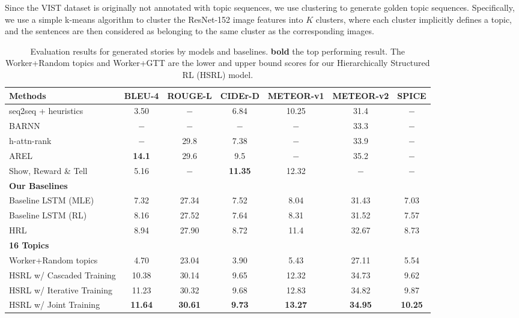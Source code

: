 \documentclass[letterpaper]{article} \usepackage{aaai19}  \usepackage{times}  \usepackage{helvet}  \usepackage{courier}  \usepackage{url}  \usepackage{graphicx}
\begin{document}
Since the VIST dataset \cite{huang2016visual} is originally not annotated with topic sequences, we use clustering to generate golden topic sequences. Specifically, we use a simple k-means algorithm to cluster the ResNet-152 image features into $K$ clusters, where each cluster implicitly defines a topic, and the  sentences are then considered as belonging to the same cluster as the corresponding images. 




{\small
	\begin{table*}[htb]
		\small
		\caption{\small Evaluation results for generated stories by models and baselines. \textbf{bold} the top performing result. The Worker+Random topics and Worker+GTT are the lower and upper bound scores for our Hierarchically Structured RL (HSRL) model. }
\label{table:BLEU}
		\centering
		\begin{tabular}{lcccccc}
			\hline
			Methods       & BLEU-4 & ROUGE-L &   CIDEr-D & METEOR-v1 & METEOR-v2 & SPICE\\
			\hline
seq2seq + heuristics~\cite{huang2016visual} & 3.50 & $-$ & 6.84 & 10.25 & 31.4 & $-$\\
BARNN~\cite{liu2017let} & $-$ & $-$ & $-$ & $-$ & 33.3 & $-$\\
			h-attn-rank~\cite{yu2017hierarchically} & $-$ & 29.8 & 7.38  & $-$ & 33.9 & $-$\\
			AREL~\cite{wang2018no} & \textbf{14.1} & 29.6 & 9.5  & $-$ & 35.2 & $-$\\
			Show, Reward \& Tell~\cite{wang2018show} & 5.16 & $-$ & \textbf{11.35}  & 12.32 & $-$ & $-$\\
			\hline
			\multicolumn{7}{l}{\textbf{Our Baselines}} \\
			\hline
			Baseline LSTM (MLE)  & 7.32 & 27.34 & 7.52 & 8.04 & 31.43 & 7.03\\
			Baseline LSTM (RL)  & 8.16 & 27.52 & 7.64 & 8.31 & 31.52 & 7.57\\
			HRL~\cite{wang2018video} & 8.94 & 27.90 & 8.72 & 11.4 & 32.67 & 8.73 \\
			\hline
			\multicolumn{7}{l}{\textbf{16 Topics}} \\
			\hline
			Worker+Random topics & 4.70 & 23.04 & 3.90 & 5.43 & 27.11 & 5.54\\
			HSRL w/ Cascaded Training & 10.38 & 30.14 & 9.65 & 12.32 & 34.73 & 9.62\\
			HSRL w/ Iterative Training & 11.23 & 30.32 & 9.68 & 12.83 & 34.82 & 9.87 \\
			HSRL w/ Joint Training & \textbf{11.64} & \textbf{30.61} &  \textbf{9.73}&  \textbf{13.27}&  \textbf{34.95} &   \textbf{10.25} \\

\end{tabular}
\end{table*}}
\end{document}
